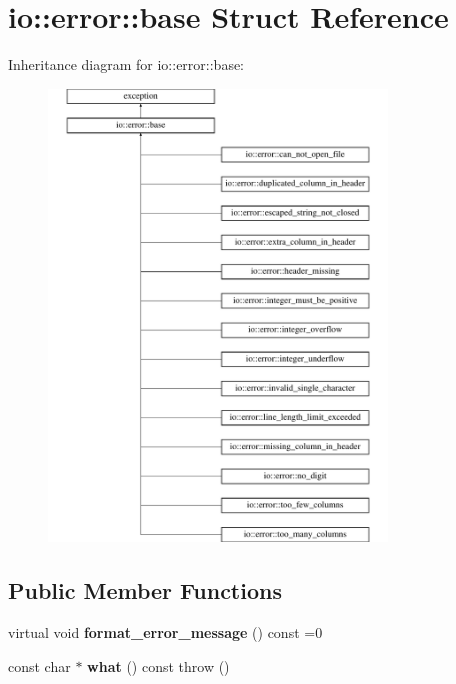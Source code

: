 \hypertarget{structio_1_1error_1_1base}{}\section{io\+:\+:error\+:\+:base Struct Reference}
\label{structio_1_1error_1_1base}
Inheritance diagram for io\+:\+:error\+:\+:base\+:\begin{figure}[H]
\begin{center}
\leavevmode
\includegraphics[height=12.000000cm]{structio_1_1error_1_1base}
\end{center}
\end{figure}
\subsection*{Public Member Functions}
\begin{DoxyCompactItemize}
\item 
\mbox{\label{structio_1_1error_1_1base_a7d9ff6a31b716a24f056cf8a3e15191d}} 
virtual void {\bfseries format\+\_\+error\+\_\+message} () const =0
\item 
\mbox{\label{structio_1_1error_1_1base_a35483dfbe91cea45cfa7c5613e83e5ef}} 
const char $\ast$ {\bfseries what} () const  throw ()
\end{DoxyCompactItemize}
